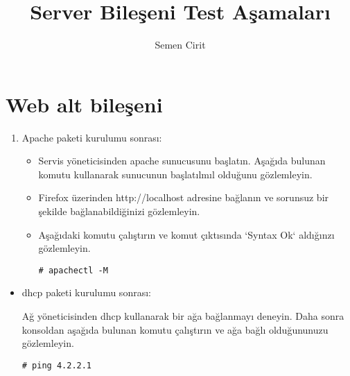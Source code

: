 \documentclass[a4paper,10pt]{article}
\title{Server Bileşeni Test Aşamaları}
\author{Semen Cirit}
\begin{document}
\maketitle
\section{Web alt bileşeni}
\begin{enumerate}
\item Apache paketi kurulumu sonrası:
\begin{itemize}
\item Servis yöneticisinden apache sunucusunu başlatın. Aşağıda bulunan komutu kullanarak sunucunun başlatılmıl olduğunu gözlemleyin.
\item Firefox üzerinden http://localhost adresine bağlanın ve sorunsuz bir şekilde bağlanabildiğinizi gözlemleyin. 
\item Aşağıdaki komutu çalıştırın ve komut çıktısında `Syntax Ok` aldığınzı gözlemleyin.
\begin{verbatim}
# apachectl -M 
\end{verbatim}

\end{itemize}

\end{enumerate}
\begin{itemize}
 \item dhcp paketi kurulumu sonrası:

Ağ yöneticisinden dhcp kullanarak bir ağa bağlanmayı deneyin. Daha sonra konsoldan aşağıda bulunan komutu çalıştırın ve ağa bağlı olduğununuzu gözlemleyin.
\begin{verbatim}
# ping 4.2.2.1
\end{verbatim}


\end{itemize}
\end{document}
